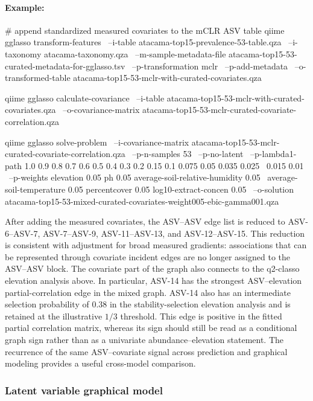 \documentclass[11pt,a4paper]{article}
\begin{document}
\paragraph{Example:} \mbox{}
\begin{PseudoCode}
# append standardized measured covariates to the mCLR ASV table
qiime gglasso transform-features \
    --i-table atacama-top15-prevalence-53-table.qza \
    --i-taxonomy atacama-taxonomy.qza \
    --m-sample-metadata-file atacama-top15-53-curated-metadata-for-gglasso.tsv \
    --p-transformation mclr \
    --p-add-metadata \
    --o-transformed-table atacama-top15-53-mclr-with-curated-covariates.qza

qiime gglasso calculate-covariance \
    --i-table atacama-top15-53-mclr-with-curated-covariates.qza \
    --o-covariance-matrix atacama-top15-53-mclr-curated-covariate-correlation.qza

qiime gglasso solve-problem \
    --i-covariance-matrix atacama-top15-53-mclr-curated-covariate-correlation.qza \
    --p-n-samples 53 \
    --p-no-latent \
    --p-lambda1-path 1.0 0.9 0.8 0.7 0.6 0.5 0.4 0.3 0.2 0.15 0.1 0.075 0.05 0.035 0.025 \
        0.015 0.01 \
    --p-weights elevation 0.05 ph 0.05 average-soil-relative-humidity 0.05 \
        average-soil-temperature 0.05 percentcover 0.05 log10-extract-concen 0.05 \
    --o-solution atacama-top15-53-mixed-curated-covariates-weight005-ebic-gamma001.qza
\end{PseudoCode}

After adding the measured covariates, the ASV--ASV edge list is reduced to
ASV-6--ASV-7, ASV-7--ASV-9, ASV-11--ASV-13, and ASV-12--ASV-15. This reduction is
consistent with adjustment for broad measured gradients: associations that can
be represented through covariate incident edges are no longer assigned to the
ASV--ASV block. The covariate part of the graph also connects to the q2-classo
elevation analysis above. In
particular, ASV-14 has the strongest ASV--elevation partial-correlation edge in
the mixed graph. ASV-14 also has an intermediate selection probability of
0.38 in the stability-selection elevation analysis and is retained at the
illustrative $1/3$ threshold.
This edge is positive in the fitted partial
correlation matrix, whereas its sign should still be read as a conditional graph
sign rather than as a univariate abundance--elevation statement. The recurrence
of the same ASV--covariate signal across prediction and graphical modeling
provides a useful cross-model comparison.

\subsubsection{Latent variable graphical model}
\label{sec:lowdim-slr}
\end{document}
